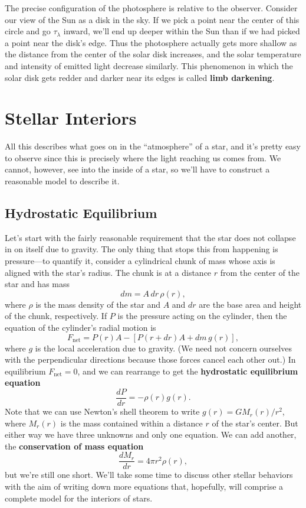 \documentclass[../a062main.tex]{subfiles}
\begin{document}
The precise configuration of the photosphere is relative to the observer.
Consider our view of the Sun as a disk in the sky.
If we pick a point near the center of this circle and go $\tau_\lambda$ inward, we'll end up deeper within the Sun than if we had picked a point near the disk's edge.
Thus the photosphere actually gets more shallow as the distance from the center of the solar disk increases, and the solar temperature and intensity of emitted light decrease similarly.
This phenomenon in which the solar disk gets redder and darker near its edges is called \textbf{limb darkening}.

\section{Stellar Interiors}
All this describes what goes on in the ``atmosphere'' of a star, and it's pretty easy to observe since this is precisely where the light reaching us comes from.
We cannot, however, see into the inside of a star, so we'll have to construct a reasonable model to describe it.

\subsection*{Hydrostatic Equilibrium}
Let's start with the fairly reasonable requirement that the star does not collapse in on itself due to gravity.
The only thing that stops this from happening is pressure---to quantify it, consider a cylindrical chunk of mass whose axis is aligned with the star's radius.
The chunk is at a distance $r$ from the center of the star and has mass
\[ dm = A \,dr \,\rho(r), \]
where $\rho$ is the mass density of the star and $A$ and $dr$ are the base area and height of the chunk, respectively.
If $P$ is the pressure acting on the cylinder, then the equation of the cylinder's radial motion is
\[ F_\textrm{net} = P(r) A - \left[ P(r + dr)A + dm\,g(r) \right], \]
where $g$ is the local acceleration due to gravity.
(We need not concern ourselves with the perpendicular directions because those forces cancel each other out.)
In equilibrium $F_\textrm{net} = 0$, and we can rearrange to get the \textbf{hydrostatic equilibrium equation}
\[ \boxed{\frac{dP}{dr} = -\rho(r) g(r)}. \]
Note that we can use Newton's shell theorem to write $g(r) = GM_r(r) / r^2$, where $M_r(r)$ is the mass contained within a distance $r$ of the star's center.
But either way we have three unknowns and only one equation.
We can add another, the \textbf{conservation of mass equation}
\[ \boxed{\frac{dM_r}{dr} = 4\pi r^2 \rho(r)}, \]
but we're still one short.
We'll take some time to discuss other stellar behaviors with the aim of writing down more equations that, hopefully, will comprise a complete model for the interiors of stars.
\end{document}
